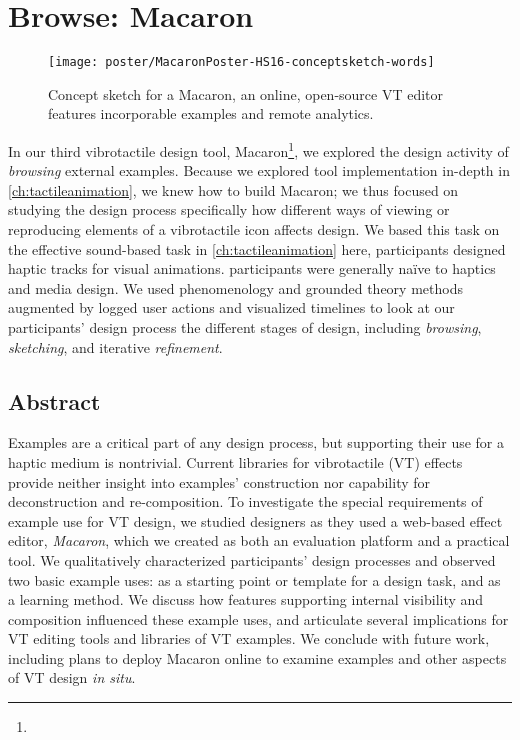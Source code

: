 


\chapter{Browse: Macaron}
\label{ch:macaron}

\begin{figure}[htbp]
\begin{center}
\texttt{[image: poster/MacaronPoster-HS16-conceptsketch-words]}
\caption{Concept sketch for a Macaron, an online, open-source VT editor features incorporable examples and remote analytics.}
\label{hapticexamples:designgallerysketch}
\end{center}
\end{figure}

\noindent
{} 
In our third vibrotactile design tool, Macaron\footnote{}, we explored the design activity of \emph{browsing} external examples.
Because we explored \haxd tool implementation in-depth in \autoref{ch:tactileanimation}, we knew how to build Macaron; we thus focused on studying the design process specifically  how different ways of viewing or reproducing elements of a vibrotactile icon affects design.
We based this task on the effective sound-based task in \autoref{ch:tactileanimation}\osE{:} here, participants designed haptic tracks for visual animations.
 participants were generally na\"ive to haptics and media design.
We used phenomenology and grounded theory methods augmented by logged user actions and visualized timelines to look at our participants' design process
the different stages of design, including \emph{browsing}, \emph{sketching}, and iterative \emph{refinement}.


\section{Abstract}
Examples are a critical part of any design process,
but supporting their use for a haptic medium is nontrivial.
Current  libraries for vibrotactile (VT) effects provide neither insight into examples' construction nor  capability for 
deconstruction and re-composition.
To investigate the special requirements of example use for VT design, we studied designers as they used a web-based effect editor, \emph{Macaron}, which we created as both an evaluation platform and a practical tool. 
We qualitatively characterized participants' design processes and observed two basic example uses: as a starting point or template for a design task, and as a learning method.
We discuss how features supporting internal visibility and composition influenced these example uses, and articulate several implications for VT editing tools and libraries of VT examples.
We conclude with future work, including plans to deploy Macaron online to examine examples and other aspects of VT design \emph{in situ}.



